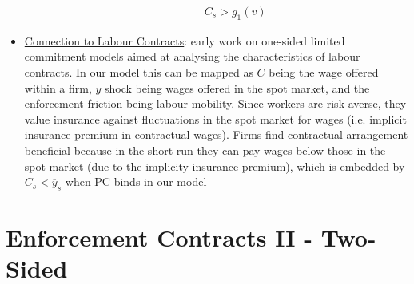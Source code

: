 \documentclass{article}
\begin{document}
\begin{itemize}
\begin{itemize}
\begin{itemize}
\begin{gather*}
                C_{s} > g_{1}(v)
            \end{gather*}
        \end{itemize}
    \end{itemize}
    \item \underline{Connection to Labour Contracts}: early work on one-sided limited commitment models aimed at analysing the characteristics of labour contracts. In our model this can be mapped as $C$ being the wage offered within a firm, $y$ shock being wages offered in the spot market, and the enforcement friction being labour mobility. Since workers are risk-averse, they value insurance against fluctuations in the spot market for wages (i.e. implicit insurance premium in contractual wages). Firms find contractual arrangement beneficial because in the short run they can pay wages below those in the spot market (due to the implicity insurance premium), which is embedded by $C_{s} < \overline{y}_{s}$ when PC binds in our model
\end{itemize}

\newpage

\section{Enforcement Contracts II - Two-Sided}
\end{document}
